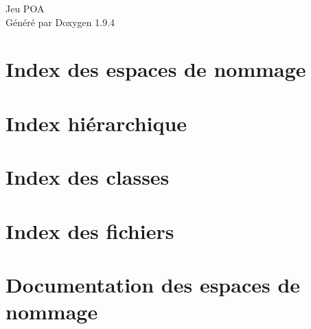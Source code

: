 \documentclass[twoside]{book}
\newcommand{\+}{\discretionary{\mbox{\scriptsize$\hookleftarrow$}}{}{}}
\newcommand{\clearemptydoublepage}{%
    \newpage{\pagestyle{empty}\cleardoublepage}%
  }
\begin{document}
  \raggedbottom
    \hypersetup{pageanchor=false,
                bookmarksnumbered=true,
                pdfencoding=unicode
               }
  \begin{titlepage}
  \vspace*{7cm}
  \begin{center}%
  {\Large Jeu POA}\\
  \vspace*{1cm}
  {\large Généré par Doxygen 1.9.4}\\
  \end{center}
  \end{titlepage}
  \clearemptydoublepage
  \tableofcontents
  \clearemptydoublepage
  \hypersetup{pageanchor=true}
\chapter{Index des espaces de nommage}

\chapter{Index hiérarchique}

\chapter{Index des classes}

\chapter{Index des fichiers}

\chapter{Documentation des espaces de nommage}



\end{document}
